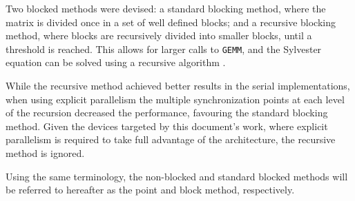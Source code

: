 \documentclass[../thesis]{subfiles}
\begin{document}
		Two blocked methods were devised: a standard blocking method, where the matrix is divided once in a set of well defined blocks; and a recursive blocking method, where blocks are recursively divided into smaller blocks, until a threshold is reached. This allows for larger calls to \texttt{GEMM}, and the Sylvester equation can be solved using a recursive algorithm \cite{Jonsson:Kagstrom:2002}.

		While the recursive method achieved better results in the serial implementations, when using explicit parallelism the multiple synchronization points at each level of the recursion decreased the performance, favouring the standard blocking method. Given the devices targeted by this document's work, where explicit parallelism is required to take full advantage of the architecture, the recursive method is ignored.

		Using the same terminology, the non-blocked and standard blocked methods will be referred to hereafter as the point and block method, respectively.
\end{document}
